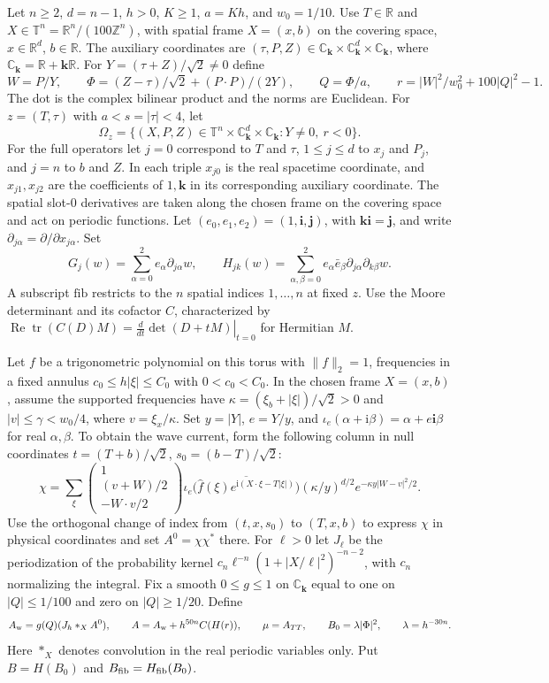 Let $n\ge2$, $d=n-1$, $h>0$, $K\ge1$, $a=Kh$, and $w_0=1/10$. Use $T\in\mathbb R$ and $X\in\mathbb T^n=\mathbb R^n/(100\mathbb Z^n)$, with spatial frame $X=(x,b)$ on the covering space, $x\in\mathbb R^d$, $b\in\mathbb R$. The auxiliary coordinates are $(\tau,P,Z)\in\mathbb C_{\mathbf k}\times\mathbb C_{\mathbf k}^d\times\mathbb C_{\mathbf k}$, where $\mathbb C_{\mathbf k}=\mathbb R+\mathbf k\mathbb R$. For $Y=(\tau+Z)/\sqrt2\ne0$ define
\[
 W=P/Y,\qquad \Phi=(Z-\tau)/\sqrt2+(P\cdot P)/(2Y),\qquad
 Q=\Phi/a,\qquad r=|W|^2/w_0^2+100|Q|^2-1 .
\]
The dot is the complex bilinear product and the norms are Euclidean. For $z=(T,\tau)$ with $a<s=|\tau|<4$, let
\[
 \Omega_z=\{(X,P,Z)\in\mathbb T^n\times\mathbb C_{\mathbf k}^d\times\mathbb C_{\mathbf k}:Y\ne0,\ r<0\}.
\]
For the full operators let $j=0$ correspond to $T$ and $\tau$, $1\le j\le d$ to $x_j$ and $P_j$, and $j=n$ to $b$ and $Z$. In each triple $x_{j0}$ is the real spacetime coordinate, and $x_{j1},x_{j2}$ are the coefficients of $1,\mathbf k$ in its corresponding auxiliary coordinate. The spatial slot-$0$ derivatives are taken along the chosen frame on the covering space and act on periodic functions. Let $(e_0,e_1,e_2)=(1,\mathbf i,\mathbf j)$, with $\mathbf k\mathbf i=\mathbf j$, and write $\partial_{j\alpha}=\partial/\partial x_{j\alpha}$. Set
\[
 G_j(w)=\sum_{\alpha=0}^2 e_\alpha\partial_{j\alpha}w,\qquad
 H_{jk}(w)=\sum_{\alpha,\beta=0}^2 e_\alpha\bar e_\beta\partial_{j\alpha}\partial_{k\beta}w .
\]
A subscript $\mathrm{fib}$ restricts to the $n$ spatial indices $1,\ldots,n$ at fixed $z$. Use the Moore determinant and its cofactor $C$, characterized by
$\operatorname{Re}\operatorname{tr}(C(D)M)=\left.\frac{d}{dt}\det(D+tM)\right|_{t=0}$
for Hermitian $M$.

Let $f$ be a trigonometric polynomial on this torus with $\|f\|_2=1$, frequencies in a fixed annulus $c_0\le h|\xi|\le C_0$ with $0<c_0<C_0$. In the chosen frame $X=(x,b)$, assume the supported frequencies have $\kappa=(\xi_b+|\xi|)/\sqrt2>0$ and $|v|\le\gamma<w_0/4$, where $v=\xi_x/\kappa$. Set $y=|Y|$, $e=Y/y$, and $\iota_e(\alpha+\mathrm i\beta)=\alpha+e\mathbf i\beta$ for real $\alpha,\beta$. To obtain the wave current, form the following column in null coordinates $t=(T+b)/\sqrt2$, $s_0=(b-T)/\sqrt2$:
\[
 \chi=\sum_{\xi}
 \begin{pmatrix}1\\(v+W)/2\\-W\cdot v/2\end{pmatrix}
 \iota_e\!\bigl(\overline{\widehat f(\xi)e^{\mathrm i(X\cdot\xi-T|\xi|)}}\bigr)
 (\kappa/y)^{d/2}e^{-\kappa y|W-v|^2/2}.
\]
Use the orthogonal change of index from $(t,x,s_0)$ to $(T,x,b)$ to express $\chi$ in physical coordinates and set $A^0=\chi\chi^*$ there. For $\ell>0$ let $J_\ell$ be the periodization of the probability kernel $c_n\ell^{-n}(1+|X/\ell|^2)^{-n-2}$, with $c_n$ normalizing the integral. Fix a smooth $0\le g\le1$ on $\mathbb C_{\mathbf k}$ equal to one on $|Q|\le1/100$ and zero on $|Q|\ge1/20$. Define
\[
 A_{\rm w}=g(Q)(J_h*_X A^0),\qquad A=A_{\rm w}+h^{50n}C(H(r)),\qquad
 \mu=A_{TT},\qquad B_0=\lambda|\Phi|^2,\qquad\lambda=h^{-30n}.
\]
Here $*_X$ denotes convolution in the real periodic variables only. Put $B=H(B_0)$ and $B_{\rm fib}=H_{\rm fib}(B_0)$.

